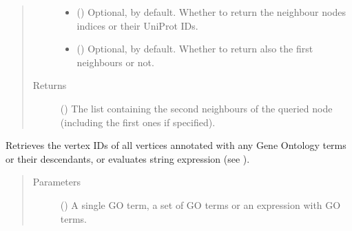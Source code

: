 \documentclass[letterpaper,10pt,english]{sphinxmanual}
\begin{document}
\begin{fulllineitems}
\begin{fulllineitems}
\begin{quote}
\begin{description}
\begin{itemize}
\item {} 
 () \textendash{} Optional,  by default. Whether to return the
neighbour nodes indices or their UniProt IDs.

\item {} 
 () \textendash{} Optional,  by default. Whether to return also the
first neighbours or not.

\end{itemize}

\item[{Returns}] \leavevmode
() \textendash{} The list containing the second neighbours of the
queried node (including the first ones if specified).

\end{description}\end{quote}

\end{fulllineitems}


\begin{fulllineitems}
\label{\detokenize{reference:pypath.main.PyPath.select_by_go}}
Retrieves the vertex IDs of all vertices annotated with any
Gene Ontology terms or their descendants, or evaluates string
expression (see ).
\begin{quote}\begin{description}
\item[{Parameters}] \leavevmode
{} (\sphinxstyleliteralemphasis{\sphinxupquote{,}}) \textendash{} A single GO term, a set of GO terms or an expression with
GO terms.

\end{description}\end{quote}

\end{fulllineitems}



\end{fulllineitems}
\end{document}
